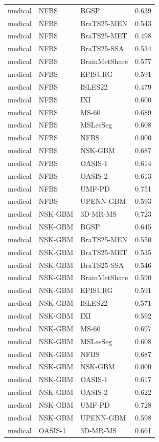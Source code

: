 \begin{tabular}{lllr}
medical & NFBS & BGSP & 0.639 \\
medical & NFBS & BraTS25-MEN & 0.543 \\
medical & NFBS & BraTS25-MET & 0.498 \\
medical & NFBS & BraTS25-SSA & 0.534 \\
medical & NFBS & BrainMetShare & 0.577 \\
medical & NFBS & EPISURG & 0.591 \\
medical & NFBS & ISLES22 & 0.479 \\
medical & NFBS & IXI & 0.600 \\
medical & NFBS & MS-60 & 0.689 \\
medical & NFBS & MSLesSeg & 0.608 \\
medical & NFBS & NFBS & 0.000 \\
medical & NFBS & NSK-GBM & 0.687 \\
medical & NFBS & OASIS-1 & 0.614 \\
medical & NFBS & OASIS-2 & 0.613 \\
medical & NFBS & UMF-PD & 0.751 \\
medical & NFBS & UPENN-GBM & 0.593 \\
medical & NSK-GBM & 3D-MR-MS & 0.723 \\
medical & NSK-GBM & BGSP & 0.645 \\
medical & NSK-GBM & BraTS25-MEN & 0.550 \\
medical & NSK-GBM & BraTS25-MET & 0.535 \\
medical & NSK-GBM & BraTS25-SSA & 0.546 \\
medical & NSK-GBM & BrainMetShare & 0.590 \\
medical & NSK-GBM & EPISURG & 0.591 \\
medical & NSK-GBM & ISLES22 & 0.571 \\
medical & NSK-GBM & IXI & 0.592 \\
medical & NSK-GBM & MS-60 & 0.697 \\
medical & NSK-GBM & MSLesSeg & 0.608 \\
medical & NSK-GBM & NFBS & 0.687 \\
medical & NSK-GBM & NSK-GBM & 0.000 \\
medical & NSK-GBM & OASIS-1 & 0.617 \\
medical & NSK-GBM & OASIS-2 & 0.622 \\
medical & NSK-GBM & UMF-PD & 0.728 \\
medical & NSK-GBM & UPENN-GBM & 0.598 \\
medical & OASIS-1 & 3D-MR-MS & 0.661 \\

\end{tabular}
